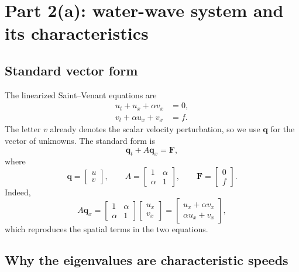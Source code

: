 \clearpage
\section{Part 2(a): water-wave system and its characteristics}

\subsection{Standard vector form}

The linearized Saint--Venant equations are
\begin{align}
 u_t+u_x+\alpha v_x&=0,\\
 v_t+\alpha u_x+v_x&=f.
\end{align}
The letter $v$ already denotes the scalar velocity perturbation, so we use
$\mathbf q$ for the vector of unknowns. The standard form is
\begin{equation}
 \boxed{\mathbf q_t+A\mathbf q_x=\mathbf F},
\end{equation}
where
\begin{equation}
 \boxed{
 \mathbf q=\begin{bmatrix}u\\v\end{bmatrix},
 \qquad
 A=\begin{bmatrix}1&\alpha\\ \alpha&1\end{bmatrix},
 \qquad
 \mathbf F=\begin{bmatrix}0\\f\end{bmatrix}.}
 \label{eq:part2-standard-form}
\end{equation}
Indeed,
\[
 A\mathbf q_x
 =\begin{bmatrix}1&\alpha\\ \alpha&1\end{bmatrix}
  \begin{bmatrix}u_x\\v_x\end{bmatrix}
 =\begin{bmatrix}u_x+\alpha v_x\\ \alpha u_x+v_x\end{bmatrix},
\]
which reproduces the spatial terms in the two equations.

\subsection{Why the eigenvalues are characteristic speeds}

